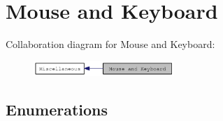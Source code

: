 \hypertarget{group__jmouse}{
\section{Mouse and Keyboard}
\label{group__jmouse}
}


Collaboration diagram for Mouse and Keyboard:\nopagebreak
\begin{figure}[H]
\begin{center}
\leavevmode
\includegraphics[width=151pt]{group__jmouse}
\end{center}
\end{figure}
\subsection*{Enumerations}

